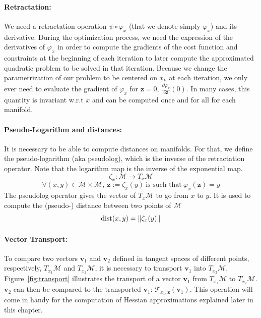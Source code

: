 \paragraph{Retractation:}
We need a retractation operation $\psi\circ\varphi_x$ (that we denote simply $\varphi_x$) and its derivative.
During the optimization process, we need the expression of the derivatives of $\varphi_x$ in order to compute the gradients of the cost function and constraints at the beginning of each iteration to later compute the approximated quadratic problem to be solved in that iteration.
Because we change the parametrization of our problem to be centered on $x_k$ at each iteration, we only ever need to evaluate the gradient of $\varphi_x$ for $\mathbf{z}=0$, $\frac{\partial \varphi_x}{\partial \mathbf{z}}(0)$.
In many cases, this quantity is invariant w.r.t $x$ and can be computed once and for all for each manifold.

\paragraph{Pseudo-Logarithm and distances:}
It is necessary to be able to compute distances on manifolds.
For that, we define the pseudo-logarithm (aka pseudolog), which is the inverse of the retractation operator.
Note that the logarithm map is the inverse of the exponential map.
\begin{equation*}
  \zeta_x:\mathcal{M}\rightarrow T_x\mathcal{M}
\end{equation*}
\begin{equation*}
  \forall (x,y)\in \mathcal{M}\times\mathcal{M},\ \mathbf{z}:=\zeta_x(y)\ \text{is such that}\ \varphi_x(\mathbf{z}) = y
\end{equation*}
The pseudolog operator gives the vector of $T_x\mathcal{M}$ to go from $x$ to $y$.
It is used to compute the (pseudo-) distance between two points of $\mathcal{M}$
\begin{equation*}
  \operatorname{dist}(x,y) = \|\zeta_x(y)\|
\end{equation*}

\paragraph{Vector Transport:}
To compare two vectors $\mathbf{v}_1$ and $\mathbf{v}_2$ defined in tangent spaces of different points, respectively, $T_{x_1}\mathcal{M}$ and $T_{x_2}\mathcal{M}$, it is necessary to transport $\mathbf{v}_1$ into $T_{x_2}\mathcal{M}$.
Figure~\ref{fig:transport} illustrates the transport of a vector $\mathbf{v}_1$ from $T_{x_1}\mathcal{M}$ to $T_{x_2}\mathcal{M}$.
$\mathbf{v}_2$ can then be compared to the transported $\mathbf{v}_1$: $\mathcal{T}_{x_1,\mathbf{z}}(\mathbf{v}_1)$.
This operation will come in handy for the computation of Hessian approximations explained later in this chapter.

